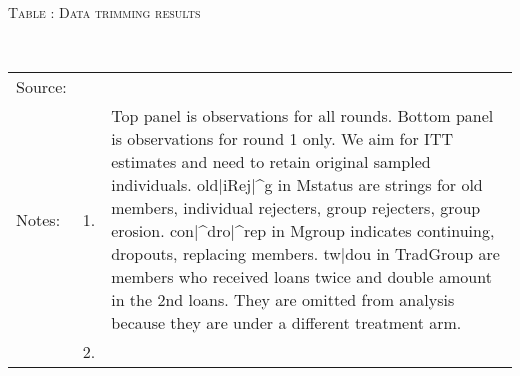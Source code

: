 \hspace{-1cm}\begin{minipage}[t]{14cm}
\hfil\textsc{\normalsize Table \thetable: Data trimming results\label{tab trim}}\\
\setlength{\tabcolsep}{1pt}
\setlength{\baselineskip}{8pt}
\renewcommand{\arraystretch}{.48}
\hfil{}\\
\renewcommand{\arraystretch}{.8}
\setlength{\tabcolsep}{1pt}
\begin{tabular}{>{\hfill\scriptsize}p{1cm}<{}>{\hfill\scriptsize}p{.25cm}<{}>{\scriptsize}p{12cm}<{\hfill}}
Source:& \multicolumn{2}{l}{\scriptsize GUK survey data.}\\
Notes: & 1. & Top panel is observations for all rounds. Bottom panel is observations for round 1 only. We aim for ITT estimates and need to retain original sampled individuals. old$|$iRej$|$\^{}g in \textsf{Mstatus} are strings for old members, individual rejecters, group rejecters, group erosion. con$|$\^{}dro$|$\^{}rep in \textsf{Mgroup} indicates continuing, dropouts, replacing members. tw$|$dou in \textsf{TradGroup} are members who received loans twice and double amount in the 2nd loans. They are omitted from analysis because they are under a different treatment arm.\\
& 2. & 
\end{tabular}
\end{minipage}





